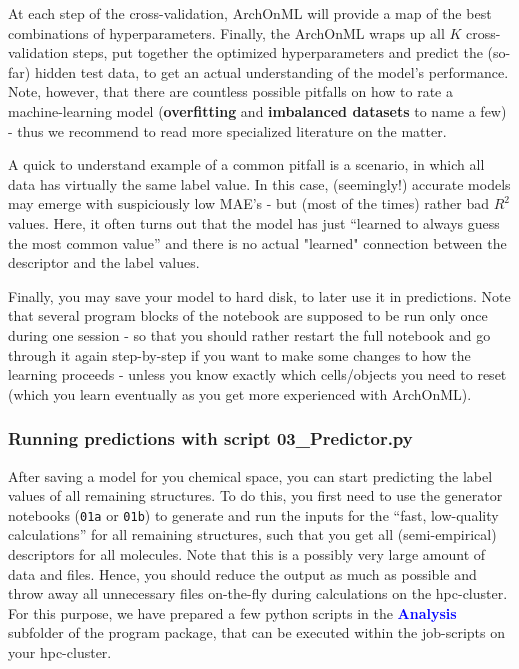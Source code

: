 \documentclass[12pt]{achemso}
\newcommand{\bl}[1]{\textcolor{blue}{\textbf{#1}}}
\begin{document}
\noindent At each step of the cross-validation, ArchOnML will provide a map of the best combinations of hyperparameters. Finally, the ArchOnML wraps up all $K$ cross-validation steps, put together the optimized hyperparameters and predict the (so-far) hidden test data, to get an actual understanding of the model's performance. Note, however, that there are countless possible pitfalls on how to rate a machine-learning model (\textbf{overfitting} and \textbf{imbalanced datasets} to name a few) - thus we recommend to read more specialized literature on the matter.

\noindent A quick to understand example of a common pitfall is a scenario, in which all data has virtually the same label value. In this case, (seemingly!) accurate models may emerge with suspiciously low MAE's - but (most of the times) rather bad $R^2$ values. Here, it often turns out that the model has just ``learned to always guess the most common value'' and there is no actual "learned" connection between the descriptor and the label values.

\noindent Finally, you may save your model to hard disk, to later use it in predictions. Note that several program blocks of the notebook are supposed to be run only once during one session - so that you should rather restart the full notebook and go through it again step-by-step if you want to make some changes to how the learning proceeds - unless you know exactly which cells/objects you need to reset (which you learn eventually as you get more experienced with ArchOnML).

\newpage

\subsubsection{Running predictions with script 03\_Predictor.py}

\noindent After saving a model for you chemical space, you can start predicting the label values of all remaining structures. To do this, you first need to use the generator notebooks (\verb+01a+ or \verb+01b+) to generate and run the inputs for the ``fast, low-quality calculations'' for all remaining structures, such that you get all (semi-empirical) descriptors for all molecules. Note that this is a possibly very large amount of data and files. Hence, you should reduce the output as much as possible and throw away all unnecessary files on-the-fly during calculations on the hpc-cluster. For this purpose, we have prepared a few python scripts in the \bl{Analysis} subfolder of the program package, that can be executed within the job-scripts on your hpc-cluster.
\end{document}
